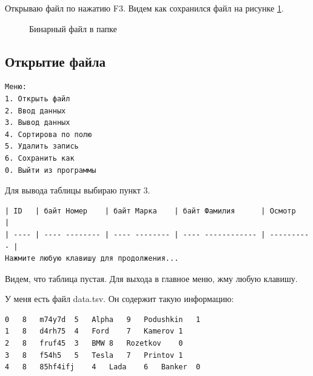 Открываю файл по нажатию F3. Видем как сохранился файл на рисунке \ref{fig:far_data_bin}.

\begin{figure}[p]
    \caption{Бинарный файл в папке}
    \label{fig:far_data_bin}
\end{figure}

\newpage

\subsection{Открытие файла}

\begin{tcolorbox}
\begin{verbatim}
Меню:
1. Открыть файл      
2. Ввод данных       
3. Вывод данных      
4. Сортирова по полю 
5. Удалить запись    
6. Сохранить как     
0. Выйти из программы
\end{verbatim}
\end{tcolorbox}

Для вывода таблицы выбираю пункт 3.

\begin{tcolorbox}
\begin{verbatim}
| ID   | байт Номер    | байт Марка    | байт Фамилия      | Осмотр     |
| ---- | ---- -------- | ---- -------- | ---- ------------ | ---------- |
Нажмите любую клавишу для продолжения...
\end{verbatim}
\end{tcolorbox}

Видем, что таблица пустая. Для выхода в главное меню, жму любую клавишу.

У меня есть файл data.tsv. Он содержит такую информацию:
\begin{tcolorbox}
\begin{verbatim}
0	8	m74y7d	5	Alpha	9	Podushkin	1
1	8	d4rh75	4	Ford	7	Kamerov	1
2	8	fruf45	3	BMW	8	Rozetkov	0
3	8	f54h5	5	Tesla	7	Printov	1
4	8	85hf4ifj	4	Lada	6	Banker	0    
\end{verbatim}
\end{tcolorbox}

